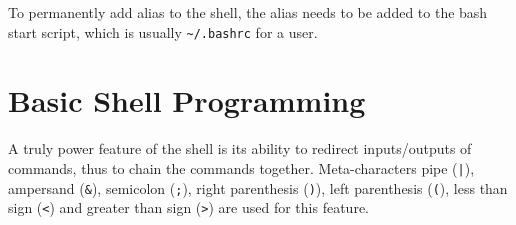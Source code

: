 To permanently add alias to the shell, the alias needs to be added to the bash start script, which is usually \verb|~/.bashrc| for a user.

\section{Basic Shell Programming}

A truly power feature of the shell is its ability to redirect inputs/outputs of commands, thus to chain the commands together. Meta-characters pipe (\verb$|$), ampersand (\verb|&|), semicolon (\verb|;|), right parenthesis (\verb|)|), left parenthesis (\verb|(|), less than sign (\verb|<|) and greater than sign (\verb|>|) are used for this feature.  






